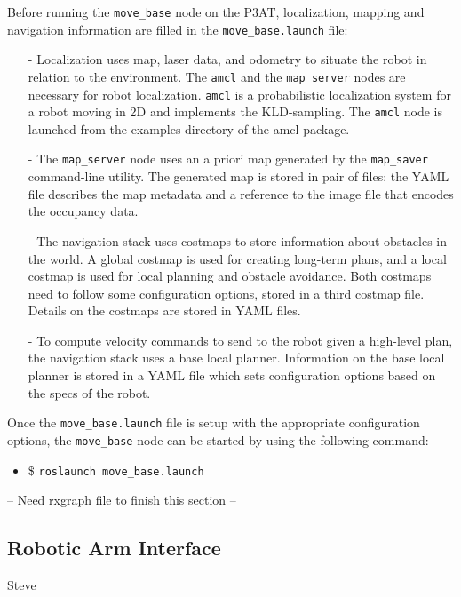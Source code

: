 Before running the \texttt{move\_base} node on the P3AT, localization, mapping and navigation information are filled in the \texttt{move\_base.launch} file:
\begin{itemize}
 \item [-] Localization uses map, laser data, and odometry to situate the robot in relation to the environment. The \texttt{amcl} and the \texttt{map\_server} nodes are necessary for robot localization. \texttt{amcl} is a probabilistic localization system for a robot moving in 2D and implements the KLD-sampling\cite{DIETER.IJRS.2003}. 
The \texttt{amcl} node is launched from the examples directory of the amcl package.
\item [-] The \texttt{map\_server} node uses an a priori map generated by the \texttt{map\_saver} command-line utility. The generated map is stored in pair of files: the YAML file describes the map metadata and a reference to the image file that encodes the occupancy data. 
\item [-] The navigation stack uses costmaps to store information about obstacles in the world. A global costmap is used for creating long-term plans, and a local costmap is used for local planning and obstacle avoidance. Both costmaps need to follow some configuration options, stored in a third costmap file. Details on the costmaps are stored in YAML files.
\item [-] To compute velocity commands to send to the robot given a high-level plan, the navigation stack uses a base local planner. Information on the base local planner is stored in a YAML file which sets configuration options based on the specs of the robot. 
\end{itemize}

Once the \texttt{move\_base.launch} file is setup with the appropriate configuration options, the \texttt{move\_base} node can be started by using the following command:
\begin{itemize}
 \item [] \item \$ \texttt{roslaunch move\_base.launch}
\end{itemize}

-- Need rxgraph file to finish this section --

\subsection*{Robotic Arm Interface}
Steve
